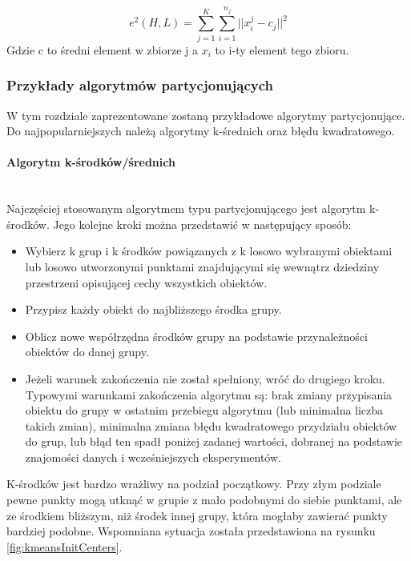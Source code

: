 \documentclass{article}
\newcommand{\myparagraph}[1]{\paragraph{#1}\mbox{}\\}
\begin{document}
\[ e^2(H,L) = \sum_{j=1}^{K}\sum_{i=1}^{n_{j}}||x_{i}^j - c_{j}||^2 \]
Gdzie c to średni element w zbiorze j a $x_{i}$ to i-ty element tego zbioru.

\subsubsection{Przykłady algorytmów partycjonujących} \label{partition_algo_examples_section}

W tym rozdziale zaprezentowane zostaną przykładowe algorytmy partycjonujące. Do najpopularniejszych należą algorytmy k-średnich oraz błędu kwadratowego.

\myparagraph{Algorytm k-środków/średnich}
Najczęściej stosowanym algorytmem typu partycjonującego jest algorytm k-środków. Jego kolejne kroki można przedstawić w następujący sposób:
\begin{itemize}
	\item Wybierz k grup i k środków powiązanych z k losowo wybranymi obiektami lub losowo utworzonymi punktami znajdującymi się wewnątrz dziedziny przestrzeni opisującej cechy wszystkich obiektów.
	\item Przypisz każdy obiekt do najbliższego środka grupy.
	\item Oblicz nowe współrzędna środków grupy na podstawie przynależności obiektów do danej grupy. 
	\item 	Jeżeli warunek zakończenia nie został spełniony, wróć do drugiego kroku. Typowymi warunkami zakończenia algorytmu są: brak zmiany przypisania obiektu do grupy w ostatnim przebiegu algorytmu (lub minimalna liczba takich zmian), minimalna zmiana błędu kwadratowego przydziału obiektów do grup, lub błąd ten spadł poniżej zadanej wartości, dobranej na podstawie znajomości danych i wcześniejszych eksperymentów.
\end{itemize}

K-środków jest bardzo wrażliwy na podział początkowy. Przy złym podziale pewne punkty  mogą utknąć w grupie z mało podobnymi do siebie punktami, ale ze środkiem bliższym, niż środek innej grupy, która mogłaby zawierać punkty bardziej podobne. Wspomniana sytuacja została przedstawiona na rysunku \ref{fig:kmeansInitCenters}.
\end{document}
